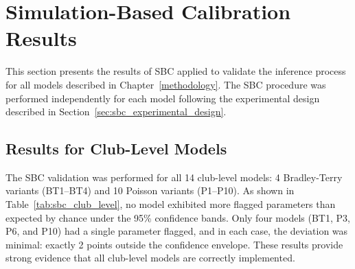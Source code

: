 \section{Simulation-Based Calibration Results}
\label{sec:sbc_results}

This section presents the results of SBC applied to validate the inference process for all models described in Chapter~\ref{methodology}.
The SBC procedure was performed independently for each model following the experimental design described in Section~\ref{sec:sbc_experimental_design}.

\subsection{Results for Club-Level Models}
\label{subsec:sbc_club}

The SBC validation was performed for all 14 club-level models: 4 Bradley-Terry variants (BT1--BT4) and 10 Poisson variants (P1--P10).
As shown in Table~\ref{tab:sbc_club_level}, no model exhibited more flagged parameters than expected by chance under the 95\% confidence bands.
Only four models (BT1, P3, P6, and P10) had a single parameter flagged, and in each case, the deviation was minimal: exactly 2 points outside the confidence envelope.
These results provide strong evidence that all club-level models are correctly implemented.

